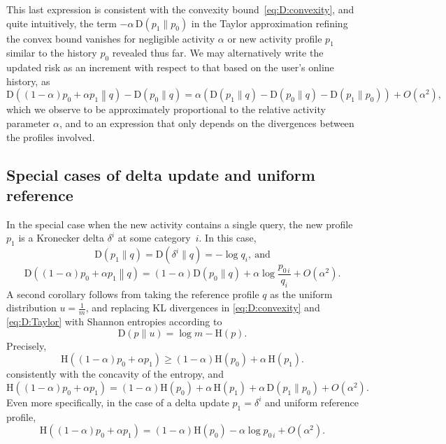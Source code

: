 This last expression is consistent with the convexity bound~\eqref{eq:D:convexity}, and quite intuitively, the term $-\alpha\,\mathrm{D}(p_1\|p_0)$ in the Taylor approximation refining the convex bound vanishes for negligible activity $\alpha$ or new activity profile $p_1$ similar to the history $p_0$ revealed thus far. We may alternatively write the updated risk as an increment with respect to that based on the user's online history, as
\begin{equation*}
\mathrm{D}\left((1-\alpha)p_0+\alpha p_1\middle\|q\right)-\mathrm{D}(p_0\|q)=\alpha\left(\mathrm{D}(p_1\|q)-\mathrm{D}(p_0\|q)-\mathrm{D}(p_1\|p_0)\right)+O(\alpha^2),
\end{equation*}
which we observe to be approximately proportional to the relative activity parameter $\alpha$, and to an expression that only depends on the divergences between the profiles involved.

\subsection{Special cases of delta update and uniform reference}
\label{sec:1-5}

\noindent
In the special case when the new activity contains a single query, the new profile $p_1$ is a Kronecker delta $\delta^i$ at some category~$i$. In this case,
\begin{equation*}
\mathrm{D}(p_1\|q)=\mathrm{D}(\delta^i\|q)=-\log q_i,\ \text{and}
\end{equation*}
\begin{equation*}
\mathrm{D}\left((1-\alpha)p_0+\alpha p_1\middle\|q\right)=(1-\alpha)\mathrm{D}(p_0\|q)+\alpha\log \frac{p_{0\,i}}{q_i}+O(\alpha^2).
\end{equation*}
A second corollary follows from taking the reference profile $q$ as the uniform distribution $u=\tfrac{1}{m}$, and replacing KL divergences in \eqref{eq:D:convexity} and \eqref{eq:D:Taylor} with Shannon entropies according to
\begin{equation}\label{eq:DvsH}
\mathrm{D}(p\|u)=\log m-\mathrm{H}(p).
\end{equation}
Precisely,
\begin{equation}\label{eq:H:convexity}
\mathrm{H}\left((1-\alpha)p_0+\alpha p_1\right)\geqslant(1-\alpha)\mathrm{H}(p_0)+\alpha\,\mathrm{H}(p_1).
\end{equation}
consistently with the concavity of the entropy, and
\begin{equation}\label{eq:H:Taylor}
\mathrm{H}\left((1-\alpha)p_0+\alpha p_1\right)=(1-\alpha)\mathrm{H}(p_0)+\alpha\,\mathrm{H}(p_1)+\alpha\,\mathrm{D}(p_1\|p_0)+O(\alpha^2).
\end{equation}
Even more specifically, in the case of a delta update $p_1=\delta^i$ and uniform reference profile,
\begin{equation*}
\mathrm{H}\left((1-\alpha)p_0+\alpha p_1\right)=(1-\alpha)\mathrm{H}(p_0)-\alpha\log p_{0\,i}+O(\alpha^2).
\end{equation*}

